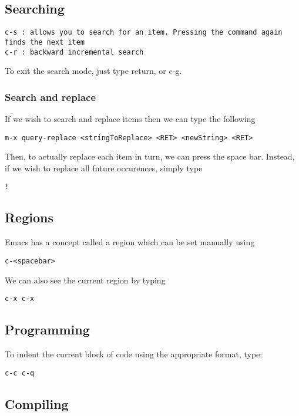 \documentclass[a4paper, 10pt]{article}
\begin{document}
\subsection{Searching}
\label{sec:searching}

\begin{verbatim}
c-s : allows you to search for an item. Pressing the command again
finds the next item
c-r : backward incremental search
\end{verbatim}
To exit the search mode, just type return, or c-g.

\subsubsection{Search and replace}
\label{sec:search-replace}

If we wish to search and replace items then we can type the following
\begin{verbatim}
m-x query-replace <stringToReplace> <RET> <newString> <RET>
\end{verbatim}
Then, to actually replace each item in turn, we can press the space
bar. Instead, if we wish to replace all future occurences, simply type 
\begin{verbatim}
!
\end{verbatim}
\subsection*{Regions}
\label{sec:regions}

Emacs has a concept called a region which can be set manually using 
\begin{verbatim}
c-<spacebar>
\end{verbatim}

We can also see the current region by typing
\begin{verbatim}
c-x c-x
\end{verbatim}


\subsection*{Programming}

To indent the current block of code using the appropriate format, type:
\begin{verbatim}
c-c c-q
 \end{verbatim}
 
 
\subsection*{Compiling}
\end{document}
